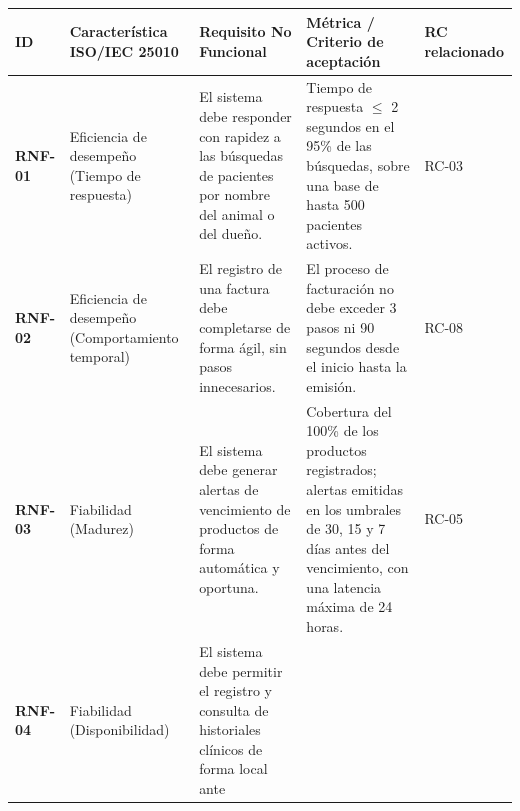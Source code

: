 \documentclass[
]{article}
\newcounter{none} %
\begin{document}
{\def\LTcaptype{none} %
\begin{longtable}[]{@{}
  >{\raggedright\arraybackslash}p{}
  >{\raggedright\arraybackslash}p{}
  >{\raggedright\arraybackslash}p{}
  >{\raggedright\arraybackslash}p{}
  >{\raggedright\arraybackslash}p{}@{}}
\toprule\noalign{}
\begin{minipage}[b]{\linewidth}\raggedright
\textbf{ID}
\end{minipage} & \begin{minipage}[b]{\linewidth}\raggedright
\textbf{Característica ISO/IEC 25010}
\end{minipage} & \begin{minipage}[b]{\linewidth}\raggedright
\textbf{Requisito No Funcional}
\end{minipage} & \begin{minipage}[b]{\linewidth}\raggedright
\textbf{Métrica / Criterio de aceptación}
\end{minipage} & \begin{minipage}[b]{\linewidth}\raggedright
\textbf{RC relacionado}
\end{minipage} \\
\midrule\noalign{}
\endhead
\bottomrule\noalign{}
\endlastfoot
\textbf{RNF-01} & Eficiencia de desempeño (Tiempo de respuesta) & El
sistema debe responder con rapidez a las búsquedas de pacientes por
nombre del animal o del dueño. & Tiempo de respuesta $\leq$ 2 segundos en
el 95\% de las búsquedas, sobre una base de hasta 500 pacientes activos.
& RC-03 \\
\textbf{RNF-02} & Eficiencia de desempeño (Comportamiento temporal) & El
registro de una factura debe completarse de forma ágil, sin pasos
innecesarios. & El proceso de facturación no debe exceder 3 pasos ni 90
segundos desde el inicio hasta la emisión. & RC-08 \\
\textbf{RNF-03} & Fiabilidad (Madurez) & El sistema debe generar alertas
de vencimiento de productos de forma automática y oportuna. & Cobertura
del 100\% de los productos registrados; alertas emitidas en los umbrales
de 30, 15 y 7 días antes del vencimiento, con una latencia máxima de 24
horas. & RC-05 \\
\textbf{RNF-04} & Fiabilidad (Disponibilidad) & El sistema debe permitir
el registro y consulta de historiales clínicos de forma local ante

\end{longtable}}
\end{document}
